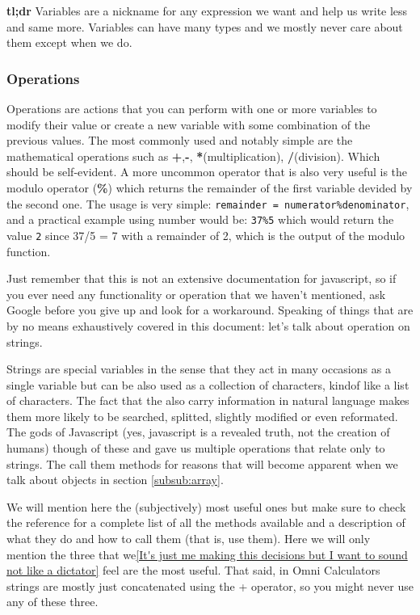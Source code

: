 \large{\textbf{tl;dr}}
Variables are a nickname for any expression we want and help us write less and same more. Variables can have many types and we mostly never care about them except when we do.

\subsubsection{Operations}
\label{subsub:operations}

Operations are actions that you can perform with one or more variables to modify their value or create a new variable with some combination of the previous values. The most commonly used and notably simple are the mathematical operations such as \textbf{+},\textbf{-}, \textbf{*}(multiplication), \textbf{/}(division). Which should be self-evident. A more uncommon operator that is also very useful is the modulo operator (\textbf{\%}) which returns the remainder of the first variable devided by the second one. The usage is very simple: \texttt{remainder = numerator\%denominator}, and a practical example using number would be: \texttt{37\%5} which would return the value \texttt{2} since 37/5 = 7 with a remainder of 2, which is the output of the modulo function. 

Just remember that this is not an extensive documentation for javascript, so if you ever need any functionality or operation that we haven't mentioned, ask Google before you give up and look for a workaround. Speaking of things that are by no means exhaustively covered in this document: let's talk about operation on strings.

Strings are special variables in the sense that they act in many occasions as a single variable but can be also used as a collection of characters, kindof like a list of characters. The fact that the also carry information in natural language makes them more likely to be searched, splitted, slightly modified or even reformated. The gods of Javascript (yes, javascript is a revealed truth, not the creation of humans) though of these and gave us multiple operations that relate only to strings. The call them methods for reasons that will become apparent when we talk about objects in section \ref{subsub:array}.

We will mention here the (subjectively) most useful ones but make sure to check the reference for a complete list of all the methods available and a description of what they do and how to call them (that is, use them). Here we will only mention the three that we\ref{It's just me making this decisions but I want to sound not like a dictator} feel are the most useful. That said, in Omni Calculators strings are mostly just concatenated using the + operator, so you might never use any of these three.

